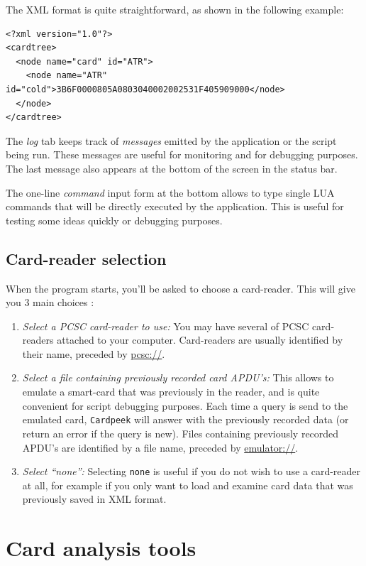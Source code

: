 \documentclass[11pt]{report}
\begin{document}
The XML format is quite straightforward, as shown in the following example:
\begin{verbatim}
<?xml version="1.0"?>
<cardtree>
  <node name="card" id="ATR">
    <node name="ATR" id="cold">3B6F0000805A0803040002002531F405909000</node>
  </node>
</cardtree>
\end{verbatim}

The \emph{log} tab keeps track of \emph{messages} emitted by the application or the script being run.
These messages are useful for monitoring and for debugging purposes. 
The last message also appears at the bottom of the screen in the status bar.

The one-line \emph{command} input form at the bottom allows to type single LUA commands that will be directly executed by the application.
This is useful for testing some ideas quickly or debugging purposes.

\section{Card-reader selection}

When the program starts, you'll be asked to choose a card-reader. 
This will give you 3 main choices :
\begin{enumerate}
\item{\emph{Select a PCSC card-reader to use:}
  You may have several of PCSC card-readers attached to your computer.
      	  Card-readers are usually identified by their name, preceded by \url{pcsc://}.}
\item{\emph{Select a file containing previously recorded card APDU's:}
  This allows to emulate a smart-card that was previously in the reader, and is quite convenient for script debugging purposes.
	  Each time a query is send to the emulated card, \texttt{Cardpeek} will answer with the previously recorded data (or return an error if the query is new).
	  Files containing previously recorded APDU's are identified by a file name, preceded by \url{emulator://}.}
\item{\emph{Select ``none'':}
  Selecting \texttt{none} is useful if you do not wish to use a card-reader at all, for example if you only want to load and examine card data that was previously saved in XML format.}
\end{enumerate}

\chapter{Card analysis tools}
\end{document}
